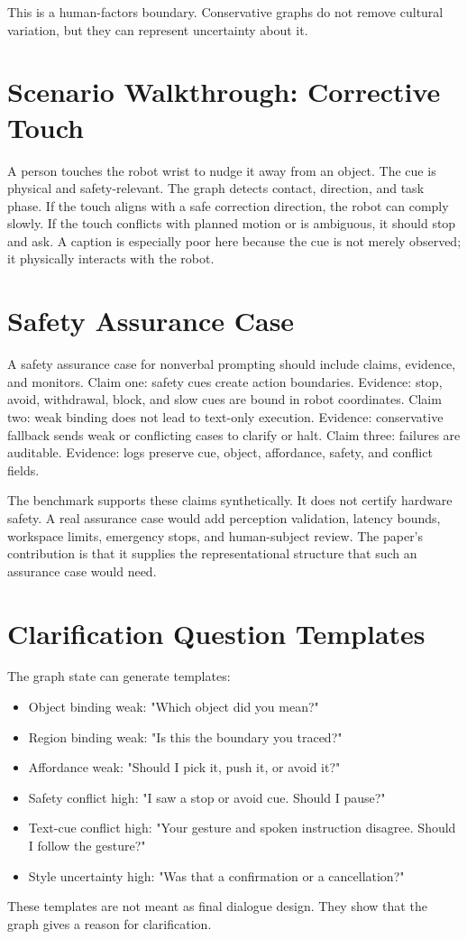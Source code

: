 \documentclass{article}
\begin{document}
This is a human-factors boundary. Conservative graphs do not remove cultural variation, but they can represent uncertainty about it.

\section{Scenario Walkthrough: Corrective Touch}

A person touches the robot wrist to nudge it away from an object. The cue is physical and safety-relevant. The graph detects contact, direction, and task phase. If the touch aligns with a safe correction direction, the robot can comply slowly. If the touch conflicts with planned motion or is ambiguous, it should stop and ask. A caption is especially poor here because the cue is not merely observed; it physically interacts with the robot.

\section{Safety Assurance Case}

A safety assurance case for nonverbal prompting should include claims, evidence, and monitors. Claim one: safety cues create action boundaries. Evidence: stop, avoid, withdrawal, block, and slow cues are bound in robot coordinates. Claim two: weak binding does not lead to text-only execution. Evidence: conservative fallback sends weak or conflicting cases to clarify or halt. Claim three: failures are auditable. Evidence: logs preserve cue, object, affordance, safety, and conflict fields.

The benchmark supports these claims synthetically. It does not certify hardware safety. A real assurance case would add perception validation, latency bounds, workspace limits, emergency stops, and human-subject review. The paper's contribution is that it supplies the representational structure that such an assurance case would need.

\section{Clarification Question Templates}

The graph state can generate templates:
\begin{itemize}
\item Object binding weak: "Which object did you mean?"
\item Region binding weak: "Is this the boundary you traced?"
\item Affordance weak: "Should I pick it, push it, or avoid it?"
\item Safety conflict high: "I saw a stop or avoid cue. Should I pause?"
\item Text-cue conflict high: "Your gesture and spoken instruction disagree. Should I follow the gesture?"
\item Style uncertainty high: "Was that a confirmation or a cancellation?"
\end{itemize}
These templates are not meant as final dialogue design. They show that the graph gives a reason for clarification.
\end{document}
